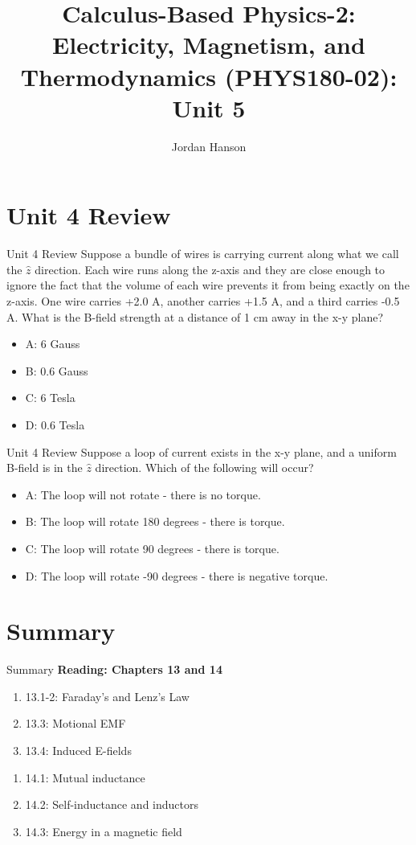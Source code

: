 \documentclass{beamer}
\title{Calculus-Based Physics-2: Electricity, Magnetism, and Thermodynamics (PHYS180-02): Unit 5}
\author{Jordan Hanson}
\institute{Whittier College Department of Physics and Astronomy}
\begin{document}
\maketitle

\section{Unit 4 Review}

\begin{frame}{Unit 4 Review}
Suppose a bundle of wires is carrying current along what we call the $\hat{z}$ direction.  Each wire runs along the z-axis and they are close enough to ignore the fact that the volume of each wire prevents it from being exactly on the z-axis.  One wire carries +2.0 A, another carries +1.5 A, and a third carries -0.5 A.  What is the B-field strength at a distance of 1 cm away in the x-y plane?
\begin{itemize}
\item A: 6 Gauss
\item B: 0.6 Gauss
\item C: 6 Tesla
\item D: 0.6 Tesla
\end{itemize}
\end{frame}

\begin{frame}{Unit 4 Review}
Suppose a loop of current exists in the x-y plane, and a uniform B-field is in the $\hat{z}$ direction.  Which of the following will occur?
\begin{itemize}
\item A: The loop will not rotate - there is no torque.
\item B: The loop will rotate 180 degrees - there is torque.
\item C: The loop will rotate 90 degrees - there is torque.
\item D: The loop will rotate -90 degrees - there is negative torque.
\end{itemize}
\end{frame}

\section{Summary}

\begin{frame}{Summary}
\textbf{Reading: Chapters 13 and 14} \\ \vspace{0.5cm}
\begin{enumerate}
\item 13.1-2: Faraday's and Lenz's Law
\item 13.3: Motional EMF
\item 13.4: Induced E-fields
\end{enumerate}
\begin{enumerate}
\item 14.1: Mutual inductance
\item 14.2: Self-inductance and inductors
\item 14.3: Energy in a magnetic field
\end{enumerate}
\end{frame}
\end{document}
